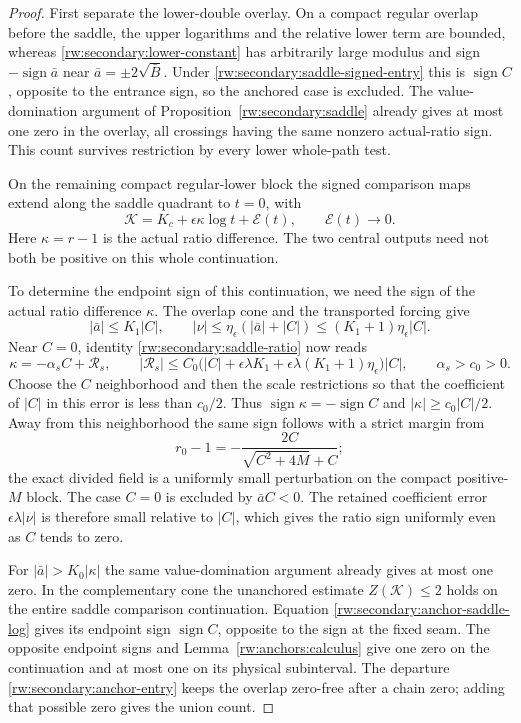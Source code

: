\begin{proof}
First separate the lower-double overlay. On a compact regular overlap
before the saddle, the upper logarithms and the relative lower term
are bounded, whereas \eqref{rw:secondary:lower-constant} has arbitrarily
large modulus and sign $-\operatorname{sign}\bar a$ near
$\bar a=\pm2\sqrt{\bar B}$. Under
\eqref{rw:secondary:saddle-signed-entry} this is
$\operatorname{sign}C$, opposite to the entrance sign, so the anchored
case is excluded. The value-domination argument of
Proposition~\ref{rw:secondary:saddle} already gives at most one
zero in the overlay, all crossings having the same nonzero actual-ratio
sign. This count survives restriction by every lower whole-path test.

On the remaining compact regular-lower block the signed comparison
maps extend along the saddle quadrant to $t=0$, with
\begin{equation}\label{rw:secondary:anchor-saddle-log}
 \mathcal K=K_c+\epsilon\kappa\log t+\mathcal E(t),
 \qquad \mathcal E(t)\longrightarrow0 .
\end{equation}
Here $\kappa=r-1$ is the actual ratio difference. The two central outputs
need not both be positive on this whole continuation.

To determine the endpoint sign of this continuation, we need the sign
of the actual ratio difference $\kappa$.
The overlap cone and the transported forcing give
\[
 |\bar a|\le K_1|C|,\qquad
 |\nu|\le\eta_\epsilon(|\bar a|+|C|)
                    \le (K_1+1)\eta_\epsilon|C|.
\]
Near $C=0$, identity \eqref{rw:secondary:saddle-ratio} now reads
\[
 \kappa=-\alpha_s C+\mathcal R_s,\qquad
 |\mathcal R_s|\le
 C_0\bigl(|C|+\epsilon\lambda K_1+
           \epsilon\lambda(K_1+1)\eta_\epsilon\bigr)|C|,
 \qquad \alpha_s>c_0>0 .
\]
Choose the $C$ neighborhood and then the scale restrictions so that
the coefficient of $|C|$ in this error is less than $c_0/2$.
Thus $\operatorname{sign}\kappa=-\operatorname{sign}C$ and
$|\kappa|\ge c_0|C|/2$. Away from this neighborhood the same sign
follows with a strict margin from
\[
 r_0-1=-\frac{2C}{\sqrt{C^2+4M}+C};
\]
the exact divided field is a uniformly small perturbation on the
compact positive-$M$ block. The case $C=0$ is excluded by
$\bar aC<0$. The retained coefficient error $\epsilon\lambda|\nu|$
is therefore small relative to $|C|$, which gives the ratio sign
uniformly even as $C$ tends to zero.

For $|\bar a|>K_0|\kappa|$ the same value-domination argument
already gives at most one zero. In the complementary cone the
unanchored estimate $Z(\mathcal K)\le2$ holds on the entire
saddle comparison continuation. Equation
\eqref{rw:secondary:anchor-saddle-log} gives its endpoint sign
$\operatorname{sign}C$, opposite to the sign at the fixed seam.
The opposite endpoint signs and Lemma~\ref{rw:anchors:calculus}
give one zero on the continuation and at most one on its physical
subinterval. The departure
\eqref{rw:secondary:anchor-entry} keeps the overlap zero-free after a
chain zero; adding that possible zero gives the union count.
\end{proof}

